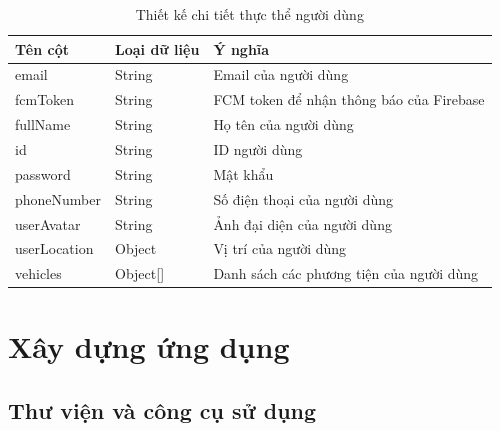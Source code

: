 \documentclass[../DoAn.tex]{subfiles}
\begin{document}
\begin{table}[H]
    \centering
    \begin{tabular}{|l|l|l|}
    \hline
    \textbf{Tên cột} & \textbf{Loại dữ liệu} & \textbf{Ý nghĩa}                         \\ \hline
    email            & String                & Email của người dùng                     \\ \hline
    fcmToken         & String                & FCM token để nhận thông báo của Firebase \\ \hline
    fullName         & String                & Họ tên của người dùng                    \\ \hline
    id               & String                & ID người dùng                            \\ \hline
    password         & String                & Mật khẩu                                 \\ \hline
    phoneNumber      & String                & Số điện thoại của người dùng             \\ \hline
    userAvatar       & String                & Ảnh đại diện của người dùng              \\ \hline
    userLocation     & Object                & Vị trí của người dùng                    \\ \hline
    vehicles         & Object[]              & Danh sách các phương tiện của người dùng \\ \hline
    \end{tabular}
    \caption{Thiết kế chi tiết thực thể người dùng}
    \label{table:Thiết_kế_chi_tiết_thực_thể_người_dùng}
\end{table}

\section{Xây dựng ứng dụng}
\subsection{Thư viện và công cụ sử dụng}
\end{document}
